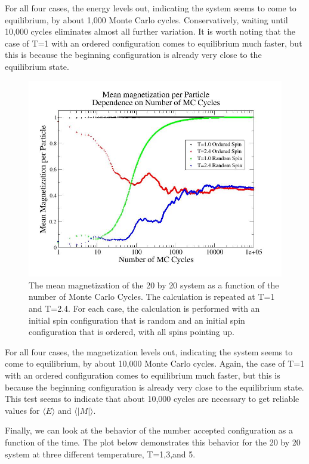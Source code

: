 \documentclass[%
oneside,                 %
final,                   %
10pt]{article}
\begin{document}
For all four cases, the energy levels out, indicating the system seems to come to equilibrium, by about 1,000 Monte Carlo cycles.  Conservatively, waiting until 10,000 cycles eliminates almost all further variation.  It is worth noting that the case of T=1 with an ordered configuration comes to equilibrium much faster, but this is because the beginning configuration is already very close to the equilibrium state.

\begin{figure}[H]\label{fig:MCMag}
  \centering
    \includegraphics[width=1.1 \textwidth]{MCMag.jpg}
    \caption{The mean magnetization of the 20 by 20 system as a function of the number of Monte Carlo Cycles.  The calculation is repeated at T=1 and T=2.4.  For each case, the calculation is performed with an initial spin configuration that is random and an initial spin configuration that is ordered, with all spins pointing up.}
\end{figure}

For all four cases, the magnetization levels out, indicating the system seems to come to equilibrium, by about 10,000 Monte Carlo cycles.  Again, the case of T=1 with an ordered configuration comes to equilibrium much faster, but this is because the beginning configuration is already very close to the equilibrium state.  This test seems to indicate that about 10,000 cycles are necessary to get reliable values for $\langle E \rangle$ and $\langle |M| \rangle$.

Finally, we can look at the behavior of the number accepted configuration as a function of the time.  The plot below demonstrates this behavior for the 20 by 20 system at three different temperature, T=1,3,and 5.
\end{document}
